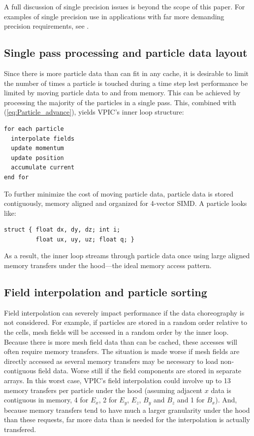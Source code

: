 \documentclass[aps,prl,preprint,preprintnumbers,groupedaddress]{revtex4}
\newcommand{\eq}[1]{(\ref{eq:#1})}
\begin{document}
A full discussion of single precision issues is beyond the scope of
this paper.  For examples of single precision use in applications with
far more demanding precision requirements, see
\cite{Bowers_et_al_2006,Lippert_et_al_2007,Langou_et_al_2006}.

\subsection{Single pass processing and particle data layout}

Since there is more particle data than can fit in any cache, it is
desirable to limit the number of times a particle is touched during a
time step lest performance be limited by moving particle data to and
from memory.  This can be achieved by processing the majority of the
particles in a single pass.  This, combined with
\eq{Particle_advance}, yields VPIC's inner loop structure:
\begin{verbatim}
for each particle
  interpolate fields
  update momentum
  update position
  accumulate current
end for
\end{verbatim}

To further minimize the cost of moving particle data, particle data is
stored contiguously, memory aligned and organized for 4-vector SIMD.
A particle looks like:
\begin{verbatim}
struct { float dx, dy, dz; int i;
         float ux, uy, uz; float q; }
\end{verbatim}
As a result, the inner loop streams through particle data once using
large aligned memory transfers under the hood---the ideal memory
access pattern.

\subsection{Field interpolation and particle sorting}

Field interpolation can severely impact performance if the data
choreography is not considered.  For example, if particles are stored
in a random order relative to the cells, mesh fields will be accessed
in a random order by the inner loop.  Because there is more mesh field
data than can be cached, these accesses will often require memory
transfers.  The situation is made worse if mesh fields are directly
accessed as several memory transfers may be necessary to load
non-contiguous field data.  Worse still if the field
components are stored in separate arrays.  In this worst case, VPIC's
field interpolation could involve up to 13 memory transfers per
particle under the hood (assuming adjacent $x$ data is contiguous in
memory, 4 for $E_x$, 2 for $E_y$, $E_z$, $B_y$ and $B_z$ and 1 for
$B_x$).  And, because memory transfers tend to have much a larger
granularity under the hood than these requests, far more data than is
needed for the interpolation is actually transfered.
\end{document}

